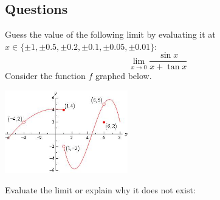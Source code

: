 \subsection*{Questions}
\begin{questions}
  \questioA Guess the value of the following limit by evaluating it at $ x \in \{ \pm 1, \pm 0.5, \pm 0.2, \pm 0.1, \pm 0.05, \pm 0.01 \} $:
            \begin{displaymath}
              \lim_{x \to 0} \frac{\sin x}{x + \tan x}
            \end{displaymath}
  \questioA Consider the function $ f $ graphed below.
    \begin{center}
      \includegraphics[width=0.4\textwidth]{oslimit}
    \end{center}
  \clearpage
  \questioM Evaluate the limit or explain why it does not exist:
    \begin{multicols}{2}
    \begin{parts}

\end{parts}
\end{multicols}
\end{questions}
